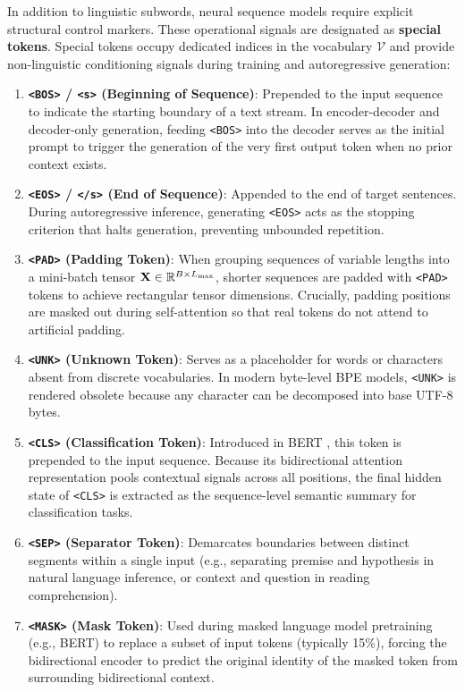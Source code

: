 \documentclass[../../main.tex]{subfiles}
\begin{document}
In addition to linguistic subwords, neural sequence models require explicit structural control markers. These operational signals are designated as \textbf{special tokens}. Special tokens occupy dedicated indices in the vocabulary $\mathcal{V}$ and provide non-linguistic conditioning signals during training and autoregressive generation:
\begin{enumerate}
    \item \textbf{\texttt{<BOS>} / \texttt{<s>} (Beginning of Sequence)}: Prepended to the input sequence to indicate the starting boundary of a text stream. In encoder-decoder and decoder-only generation, feeding \texttt{<BOS>} into the decoder serves as the initial prompt to trigger the generation of the very first output token when no prior context exists.
    \item \textbf{\texttt{<EOS>} / \texttt{</s>} (End of Sequence)}: Appended to the end of target sentences. During autoregressive inference, generating \texttt{<EOS>} acts as the stopping criterion that halts generation, preventing unbounded repetition.
    \item \textbf{\texttt{<PAD>} (Padding Token)}: When grouping sequences of variable lengths into a mini-batch tensor $\mathbf{X} \in \mathbb{R}^{B \times L_{\max}}$, shorter sequences are padded with \texttt{<PAD>} tokens to achieve rectangular tensor dimensions. Crucially, padding positions are masked out during self-attention so that real tokens do not attend to artificial padding.
    \item \textbf{\texttt{<UNK>} (Unknown Token)}: Serves as a placeholder for words or characters absent from discrete vocabularies. In modern byte-level BPE models, \texttt{<UNK>} is rendered obsolete because any character can be decomposed into base UTF-8 bytes.
    \item \textbf{\texttt{<CLS>} (Classification Token)}: Introduced in BERT \cite{devlin2019}, this token is prepended to the input sequence. Because its bidirectional attention representation pools contextual signals across all positions, the final hidden state of \texttt{<CLS>} is extracted as the sequence-level semantic summary for classification tasks.
    \item \textbf{\texttt{<SEP>} (Separator Token)}: Demarcates boundaries between distinct segments within a single input (e.g., separating premise and hypothesis in natural language inference, or context and question in reading comprehension).
    \item \textbf{\texttt{<MASK>} (Mask Token)}: Used during masked language model pretraining (e.g., BERT) to replace a subset of input tokens (typically 15\%), forcing the bidirectional encoder to predict the original identity of the masked token from surrounding bidirectional context.
\end{enumerate}
\end{document}
